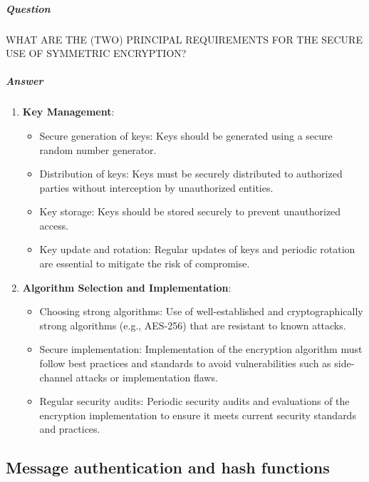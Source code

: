\documentclass{article}
\begin{document}
                            \subparagraph{Question}
                            WHAT ARE THE (TWO) PRINCIPAL
                            REQUIREMENTS FOR THE SECURE
                            USE OF SYMMETRIC ENCRYPTION?
                            \subparagraph{Answer}
                            \begin{enumerate}
                                \item \textbf{Key Management}:
                                \begin{itemize}
                                    \item Secure generation of keys: Keys should be generated using a secure random number generator.
                                    \item Distribution of keys: Keys must be securely distributed to authorized parties without interception by unauthorized entities.
                                    \item Key storage: Keys should be stored securely to prevent unauthorized access.
                                    \item Key update and rotation: Regular updates of keys and periodic rotation are essential to mitigate the risk of compromise.
                                \end{itemize}
                                
                                \item \textbf{Algorithm Selection and Implementation}:
                                \begin{itemize}
                                    \item Choosing strong algorithms: Use of well-established and cryptographically strong algorithms (e.g., AES-256) that are resistant to known attacks.
                                    \item Secure implementation: Implementation of the encryption algorithm must follow best practices and standards to avoid vulnerabilities such as side-channel attacks or implementation flaws.
                                    \item Regular security audits: Periodic security audits and evaluations of the encryption implementation to ensure it meets current security standards and practices.
                                \end{itemize}
                            \end{enumerate}
                    \subsection{Message authentication and hash functions}
\end{document}
